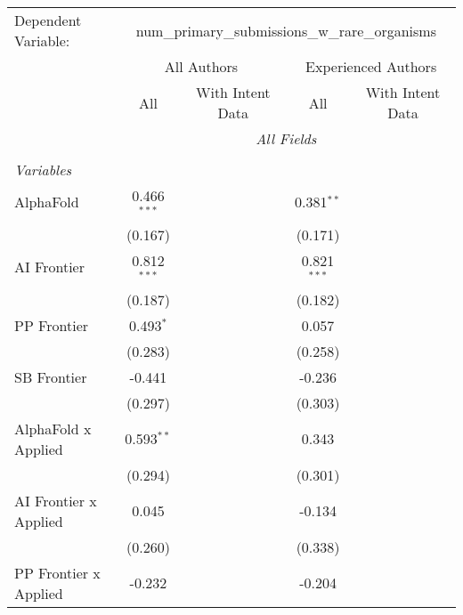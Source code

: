 \begingroup
\centering
\begin{tabular}{lcccccc}
   \tabularnewline \midrule \midrule
   Dependent Variable: & \multicolumn{6}{c}{num\_primary\_submissions\_w\_rare\_organisms}\\
 & \multicolumn{3}{c}{All Authors} & \multicolumn{3}{c}{Experienced Authors} \\
\cmidrule(lr){2-4} \cmidrule(lr){5-7}
 & \multicolumn{1}{c}{All} & \multicolumn{2}{c}{With Intent Data} & \multicolumn{1}{c}{All} & \multicolumn{2}{c}{With Intent Data} \\
\cmidrule(lr){2-2} \cmidrule(lr){3-4} \cmidrule(lr){5-5} \cmidrule(lr){6-7}
 & \multicolumn{6}{c}{\textit{All Fields}} \\ \\
   \emph{Variables}\\
   AlphaFold             & 0.466$^{***}$ &         &         & 0.381$^{**}$  &         &   \\   
                         & (0.167)       &         &         & (0.171)       &         &   \\   
   AI Frontier           & 0.812$^{***}$ &         &         & 0.821$^{***}$ &         &   \\   
                         & (0.187)       &         &         & (0.182)       &         &   \\   
   PP Frontier           & 0.493$^{*}$   &         &         & 0.057         &         &   \\   
                         & (0.283)       &         &         & (0.258)       &         &   \\   
   SB Frontier           & -0.441        &         &         & -0.236        &         &   \\   
                         & (0.297)       &         &         & (0.303)       &         &   \\   
   AlphaFold x Applied   & 0.593$^{**}$  &         &         & 0.343         &         &   \\   
                         & (0.294)       &         &         & (0.301)       &         &   \\   
   AI Frontier x Applied & 0.045         &         &         & -0.134        &         &   \\   
                         & (0.260)       &         &         & (0.338)       &         &   \\   
   PP Frontier x Applied & -0.232        &         &         & -0.204        &         &   \\   

\end{tabular}
